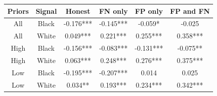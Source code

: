 \begin{table}[H]\centering \begin{tabular}{cccccc} \hline \hline
\textbf{Priors}&\textbf{Signal}&\textbf{Honest}&\textbf{FN only}&\textbf{FP only}&\textbf{FP and FN}\\ \hline
All&Black&-0.176***&-0.145***&-0.059*&-0.025\\
All&White&0.049***&0.221***&0.255***&0.358***\\
High&Black&-0.156***&-0.083***&-0.131***&-0.075**\\
High&White&0.063***&0.248***&0.276***&0.375***\\
Low&Black&-0.195***&-0.207***&0.014&0.025\\
Low&White&0.034**&0.193***&0.234***&0.342***\\
\hline \end{tabular} \end{table}
